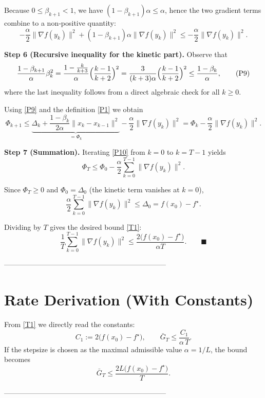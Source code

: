 \documentclass[11pt]{article}
\begin{document}
Because $0\le\beta_{k+1}<1$, we have $(1-\beta_{k+1})\alpha\le\alpha$,
hence the two gradient terms combine to a non‑positive quantity:
\[
-\frac{\alpha}{2}\|\nabla f(y_k)\|^{2}
+(1-\beta_{k+1})\alpha\|\nabla f(y_k)\|^{2}
\le -\frac{\alpha}{2}\|\nabla f(y_k)\|^{2}. \tag{P8}
\]

\noindent\textbf{Step 6 (Recursive inequality for the kinetic part).}  
Observe that
\[
\frac{1-\beta_{k+1}}{\alpha}\beta_k^{2}
= \frac{1-\frac{k}{k+3}}{\alpha}\Bigl(\frac{k-1}{k+2}\Bigr)^{2}
= \frac{3}{(k+3)\alpha}\Bigl(\frac{k-1}{k+2}\Bigr)^{2}
\le \frac{1-\beta_k}{\alpha},
\tag{P9}
\]
where the last inequality follows from a direct algebraic check for all
$k\ge0$.

Using \eqref{P9} and the definition \eqref{P1} we obtain
\[
\Phi_{k+1}\le
\underbrace{\Delta_k+\frac{1-\beta_k}{2\alpha}\|x_k-x_{k-1}\|^{2}}_{=\Phi_k}
-\frac{\alpha}{2}\|\nabla f(y_k)\|^{2}
= \Phi_k-\frac{\alpha}{2}\|\nabla f(y_k)\|^{2}. \tag{P10}
\]

\noindent\textbf{Step 7 (Summation).}  
Iterating \eqref{P10} from $k=0$ to $k=T-1$ yields
\[
\Phi_T \le \Phi_0 -\frac{\alpha}{2}\sum_{k=0}^{T-1}\|\nabla f(y_k)\|^{2}.
\tag{P11}
\]

Since $\Phi_T\ge 0$ and $\Phi_0=\Delta_0$ (the kinetic term vanishes at $k=0$),
\[
\frac{\alpha}{2}\sum_{k=0}^{T-1}\|\nabla f(y_k)\|^{2}
\le \Delta_0 = f(x_0)-f^\star.
\tag{P12}
\]

Dividing by $T$ gives the desired bound \eqref{T1}:
\[
\frac{1}{T}\sum_{k=0}^{T-1}\|\nabla f(y_k)\|^{2}
\le \frac{2\bigl(f(x_0)-f^\star\bigr)}{\alpha T}.
\qquad\blacksquare
\]

--------------------------------------------------------------------

\section*{Rate Derivation (With Constants)}
From \eqref{T1} we directly read the constants:
\[
C_1:=2\bigl(f(x_0)-f^\star\bigr),\qquad
\bar{G}_T\le \frac{C_1}{\alpha\,T}.
\]
If the stepsize is chosen as the maximal admissible value $\alpha=1/L$,
the bound becomes
\[
\bar{G}_T\le \frac{2L\bigl(f(x_0)-f^\star\bigr)}{T}.
\]

--------------------------------------------------------------------
\end{document}
